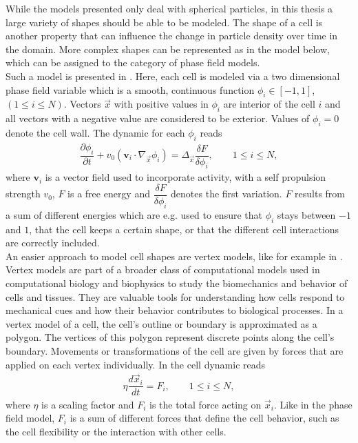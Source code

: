 \documentclass[a4paper,12pt,leqno]{article}
\theoremstyle{plain}
\theoremstyle{remark}
\begin{document}
While the models presented only deal with spherical particles, in this thesis a large variety of shapes should be able to be modeled. The shape of a cell is another property that can influence the change in particle density over time in the domain. More complex shapes can be represented as in the model below, which can be assigned to the category of phase field models.  \\
Such a model is presented in \cite{Happel2023}. Here, each cell is modeled via a two dimensional phase field variable which is a smooth, continuous function $\phi_i \in [-1, 1]$, $(1 \leq i \leq N)$. Vectors $\vec{x}$ with positive values in $\phi_i$ are interior of the cell $i$ and all vectors with a negative value are considered to be exterior. Values of $\phi_i = 0$ denote the cell wall. The dynamic for each $\phi_i$ reads
\begin{align}
	\dfrac{ \partial \phi_i}{ \partial t} + v_0(\textbf{v}_i \cdot \nabla_{\vec{x}} \phi_i) = \Delta_{\vec{x}} \dfrac{\delta F}{\delta \phi_i}, \qquad 1 \leq i \leq N \label{eq:phasefield},
\end{align}
where $\textbf{v}_i$ is a vector field used to incorporate activity, with a self propulsion strength $v_0$, $F$ is a free energy and $\dfrac{\delta F}{\delta \phi_i}$ denotes the first variation. $F$ results from a sum of different energies which are e.g. used to ensure that $\phi_i$ stays between $-1$ and $1$, that the cell keeps a certain shape, or that the different cell interactions are correctly included. \\
An easier approach to model cell shapes are vertex models, like for example in \cite{Fletcher14}.
Vertex models are part of a broader class of computational models used in computational biology and biophysics to study the biomechanics and behavior of cells and tissues. They are valuable tools for understanding how cells respond to mechanical cues and how their behavior contributes to biological processes. In a vertex model of a cell, the cell's outline or boundary is approximated as a polygon. The vertices of this polygon represent discrete points along the cell's boundary. Movements or transformations of the cell are given by forces that are applied on each vertex individually. In \cite{Fletcher14} the cell dynamic reads 
\begin{align}
	\eta \dfrac{d \vec{x}_i}{dt} = F_i, \qquad 1 \leq i \leq N \label{eq:vertexmodel}, 
\end{align}
where $\eta$ is a scaling factor and $F_i$ is the total force acting on $\vec{x}_i$. Like in the phase field model, $F_i$ is a sum of different forces that define the cell behavior, such as the cell flexibility or the interaction with other cells.  \\
\end{document}
